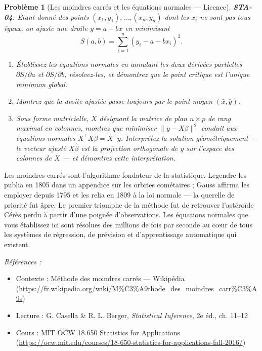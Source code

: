 \documentclass[11pt]{article}
\newtheorem{problem}{Problème}
\newenvironment{refs}{\par\small\noindent\emph{Références :}\begin{itemize}\setlength\itemsep{0pt}}{\end{itemize}\normalsize}
\begin{document}
\begin{problem}[{Les moindres carrés et les équations normales --- Licence}]
\textbf{STA-04.} Étant donné des points $ (x_1, y_1), \dots, (x_n, y_n) $ dont les $ x_i $
ne sont pas tous égaux, on ajuste une droite $ y = a + bx $ en minimisant
\[ S(a,b) = \sum_{i=1}^{n} (y_i - a - b x_i)^2 . \]
\begin{enumerate}
\item[(a)] Établissez les équations normales en annulant les deux dérivées partielles
$ \partial S/\partial a $ et $ \partial S/\partial b $, résolvez-les, et démontrez que le point
critique est l'unique minimum global.
\item[(b)] Montrez que la droite ajustée passe toujours par le point moyen
$ (\bar{x}, \bar{y}) $.
\item[(c)] Sous forme matricielle, $ X $ désignant la matrice de plan $ n \times p $ de rang maximal
en colonnes, montrez que minimiser $ \lVert y - X\beta \rVert^2 $ conduit aux équations normales
$ X^{\top} X \beta = X^{\top} y $. Interprétez la solution géométriquement --- le vecteur ajusté
$ X\hat{\beta} $ est la projection orthogonale de $ y $ sur l'espace des colonnes de $ X $ ---
et démontrez cette interprétation.
\end{enumerate}

\end{problem}

\noindent Les moindres carrés sont l'algorithme fondateur de la statistique. Legendre les
publia en 1805 dans un appendice sur les orbites cométaires ; Gauss affirma les employer depuis
1795 et les relia en 1809 à la loi normale --- la querelle de priorité fut âpre. Le premier triomphe
de la méthode fut de retrouver l'astéroïde Cérès perdu à partir d'une poignée d'observations. Les
équations normales que vous établissez ici sont résolues des millions de fois par seconde au c\oe{}ur
de tous les systèmes de régression, de prévision et d'apprentissage automatique qui existent.

\begin{refs}
\item Contexte : Méthode des moindres carrés --- Wikipédia (\url{https://fr.wikipedia.org/wiki/M%C3%A9thode_des_moindres_carr%C3%A9s})
\item Lecture : G. Casella \& R. L. Berger, \textit{Statistical Inference}, 2e éd., ch. 11--12
\item Cours : MIT OCW 18.650 Statistics for Applications (\url{https://ocw.mit.edu/courses/18-650-statistics-for-applications-fall-2016/})
\end{refs}
\end{document}
